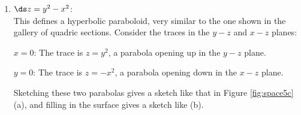{\begin{enumerate}
	$z=0$:	The trace is the ellipse $\ds x^2+\frac{y^2}{9}=1,$ with major axis along the $y$-axis. 
	
	Graphing each trace in the respective plane creates a sketch as shown in Figure \ref{fig:space5b} (a). Filling in the surface gives Figure \ref{fig:space5b} (b).
	
	\item		$\ds z=y^2-x^2$:\\[5pt]
	This defines a hyperbolic paraboloid, very similar to the one shown in the gallery of quadric sections. Consider the traces in the $y-z$ and $x-z$ planes:
	
	$x=0$: 	The trace is $z=y^2$, a parabola opening up in the $y-z$ plane.
	
	$y=0$: 	The trace is $z=-x^2$, a parabola opening down in the $x-z$ plane. 
	
	Sketching these two parabolas gives a sketch like that in Figure \ref{fig:space5c} (a), and filling in the surface gives a sketch like (b).
	
\end{enumerate}
\baselineskip
}\\

